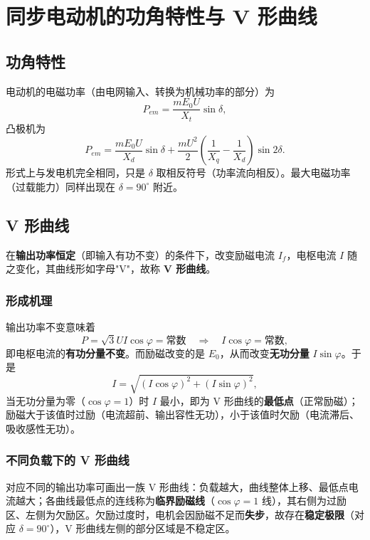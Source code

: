 \section{同步电动机的功角特性与 V 形曲线}

\subsection{功角特性}
电动机的电磁功率（由电网输入、转换为机械功率的部分）为
\begin{equation}
P_{em}=\frac{mE_0U}{X_t}\sin\delta ,
\end{equation}
凸极机为
\begin{equation}
P_{em}=\frac{mE_0U}{X_d}\sin\delta+\frac{mU^{2}}{2}\left(\frac{1}{X_q}-\frac{1}{X_d}\right)\sin2\delta .
\end{equation}
形式上与发电机完全相同，只是 $\delta$ 取相反符号（功率流向相反）。最大电磁功率（过载能力）同样出现在 $\delta=90^\circ$ 附近。

\subsection{V 形曲线}
在\textbf{输出功率恒定}（即输入有功不变）的条件下，改变励磁电流 $I_f$，电枢电流 $I$ 随之变化，其曲线形如字母"V"，故称 \textbf{V 形曲线}。

\subsubsection{形成机理}
输出功率不变意味着
\begin{equation}
P=\sqrt3UI\cos\varphi=\text{常数}\quad\Longrightarrow\quad I\cos\varphi=\text{常数},
\end{equation}
即电枢电流的\textbf{有功分量不变}。而励磁改变的是 $E_0$，从而改变\textbf{无功分量} $I\sin\varphi$。于是
\begin{equation}
I=\sqrt{\left(I\cos\varphi\right)^{2}+\left(I\sin\varphi\right)^{2}},
\end{equation}
当无功分量为零（$\cos\varphi=1$）时 $I$ 最小，即为 V 形曲线的\textbf{最低点}（正常励磁）；励磁大于该值时过励（电流超前、输出容性无功），小于该值时欠励（电流滞后、吸收感性无功）。

\subsubsection{不同负载下的 V 形曲线}
对应不同的输出功率可画出一族 V 形曲线：负载越大，曲线整体上移、最低点电流越大；各曲线最低点的连线称为\textbf{临界励磁线}（$\cos\varphi=1$ 线），其右侧为过励区、左侧为欠励区。欠励过度时，电机会因励磁不足而\textbf{失步}，故存在\textbf{稳定极限}（对应 $\delta=90^\circ$），V 形曲线左侧的部分区域是不稳定区。

